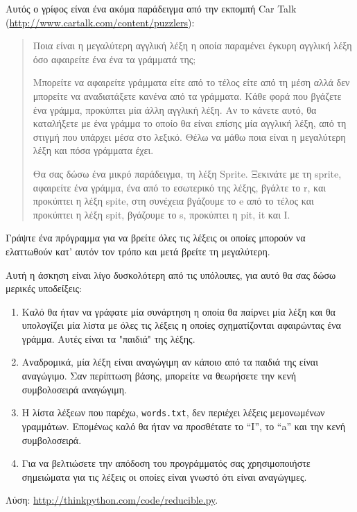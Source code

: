 \documentclass[10pt]{book}
\begin{document}
 
\begin{exercise} 

Αυτός ο γρίφος είναι ένα ακόμα παράδειγμα από την εκπομπή Car Talk (\url{http://www.cartalk.com/content/puzzlers}):

\begin{quote}
Ποια είναι η μεγαλύτερη αγγλική λέξη η οποία παραμένει έγκυρη αγγλική λέξη όσο αφαιρείτε ένα ένα τα γράμματά της; 

Μπορείτε να αφαιρείτε γράμματα είτε από το τέλος είτε από τη μέση αλλά δεν μπορείτε να αναδιατάξετε κανένα από τα γράμματα. Κάθε φορά που βγάζετε ένα γράμμα, προκύπτει μία άλλη αγγλική λέξη. Αν το κάνετε αυτό, θα καταλήξετε με ένα γράμμα το οποίο θα είναι επίσης μία αγγλική λέξη, από τη στιγμή που υπάρχει μέσα στο λεξικό. Θέλω να μάθω ποια είναι η μεγαλύτερη λέξη και πόσα γράμματα έχει.

Θα σας δώσω ένα μικρό παράδειγμα, τη λέξη  Sprite. Ξεκινάτε με τη sprite,  αφαιρείτε ένα γράμμα, ένα από το εσωτερικό της λέξης, βγάλτε το  r, και προκύπτει η λέξη spite, στη συνέχεια βγάζουμε το e από το τέλος και προκύπτει η λέξη spit, βγάζουμε το s, προκύπτει η pit, it και I.
\end{quote}

Γράψτε ένα πρόγραμμα για να βρείτε όλες τις λέξεις οι οποίες μπορούν να ελαττωθούν κατ' αυτόν τον τρόπο και μετά βρείτε τη μεγαλύτερη.

Αυτή η άσκηση είναι λίγο δυσκολότερη από τις υπόλοιπες, για αυτό θα σας δώσω μερικές υποδείξεις:

\begin{enumerate}

\item  Καλό θα ήταν να γράφατε μία συνάρτηση η οποία θα παίρνει μία λέξη και θα υπολογίζει μία λίστα με όλες τις λέξεις η οποίες σχηματίζονται αφαιρώντας ένα γράμμα. Αυτές είναι τα  "παιδιά" της λέξης. 

\item  Αναδρομικά, μία λέξη είναι αναγώγιμη αν κάποιο από τα παιδιά της είναι αναγώγιμο. Σαν περίπτωση βάσης, μπορείτε να θεωρήσετε την κενή συμβολοσειρά αναγώγιμη. 

\item  Η λίστα λέξεων που παρέχω, {\tt words.txt}, δεν περιέχει λέξεις μεμονωμένων γραμμάτων. Επομένως καλό θα ήταν να προσθέτατε το ``I'', το ``a'' και την κενή συμβολοσειρά. 

\item  Για να βελτιώσετε την απόδοση του προγράμματός σας χρησιμοποιήστε σημειώματα για τις λέξεις οι οποίες είναι γνωστό ότι είναι αναγώγιμες. 
\end{enumerate}

Λύση: \url{http://thinkpython.com/code/reducible.py}.

\end{exercise}
\end{document}
